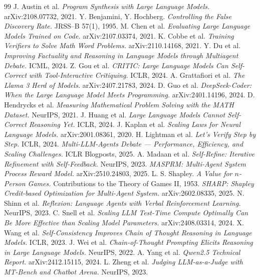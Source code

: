 \documentclass[11pt,a4paper]{article}
\begin{document}
\begin{thebibliography}{99}\small
{} J. Austin et al. \emph{Program Synthesis with Large Language Models.}
arXiv:2108.07732, 2021.
 Y. Benjamini, Y. Hochberg. \emph{Controlling the False Discovery Rate.}
JRSS--B 57(1), 1995.
 M. Chen et al. \emph{Evaluating Large Language Models Trained on Code.}
arXiv:2107.03374, 2021.
 K. Cobbe et al. \emph{Training Verifiers to Solve Math Word Problems.}
arXiv:2110.14168, 2021.
 Y. Du et al. \emph{Improving Factuality and Reasoning in Language Models
through Multiagent Debate.} ICML, 2024.
 Z. Gou et al. \emph{CRITIC: Large Language Models Can Self-Correct with
Tool-Interactive Critiquing.} ICLR, 2024.
 A. Grattafiori et al. \emph{The Llama 3 Herd of Models.}
arXiv:2407.21783, 2024.
 D. Guo et al. \emph{DeepSeek-Coder: When the Large Language Model Meets
Programming.} arXiv:2401.14196, 2024.
 D. Hendrycks et al. \emph{Measuring Mathematical Problem Solving with
the MATH Dataset.} NeurIPS, 2021.
 J. Huang et al. \emph{Large Language Models Cannot Self-Correct Reasoning
Yet.} ICLR, 2024.
 J. Kaplan et al. \emph{Scaling Laws for Neural Language Models.}
arXiv:2001.08361, 2020.
 H. Lightman et al. \emph{Let's Verify Step by Step.} ICLR, 2024.
 \emph{Multi-LLM-Agents Debate --- Performance, Efficiency, and Scaling
Challenges.} ICLR Blogposts, 2025. 
 A. Madaan et al. \emph{Self-Refine: Iterative Refinement with
Self-Feedback.} NeurIPS, 2023.
 \emph{MASPRM: Multi-Agent System Process Reward Model.} arXiv:2510.24803,
2025.
 L. S. Shapley. \emph{A Value for $n$-Person Games.} Contributions to the
Theory of Games II, 1953.
 \emph{SHARP: Shapley Credit-based Optimization for Multi-Agent System.}
arXiv:2602.08335, 2025.
 N. Shinn et al. \emph{Reflexion: Language Agents with Verbal Reinforcement
Learning.} NeurIPS, 2023.
 C. Snell et al. \emph{Scaling LLM Test-Time Compute Optimally Can Be More
Effective than Scaling Model Parameters.} arXiv:2408.03314, 2024.
 X. Wang et al. \emph{Self-Consistency Improves Chain of Thought Reasoning in
Language Models.} ICLR, 2023.
 J. Wei et al. \emph{Chain-of-Thought Prompting Elicits Reasoning in Large
Language Models.} NeurIPS, 2022.
 A. Yang et al. \emph{Qwen2.5 Technical Report.} arXiv:2412.15115, 2024.
 L. Zheng et al. \emph{Judging LLM-as-a-Judge with MT-Bench and Chatbot
Arena.} NeurIPS, 2023.
\end{thebibliography}
\end{document}
